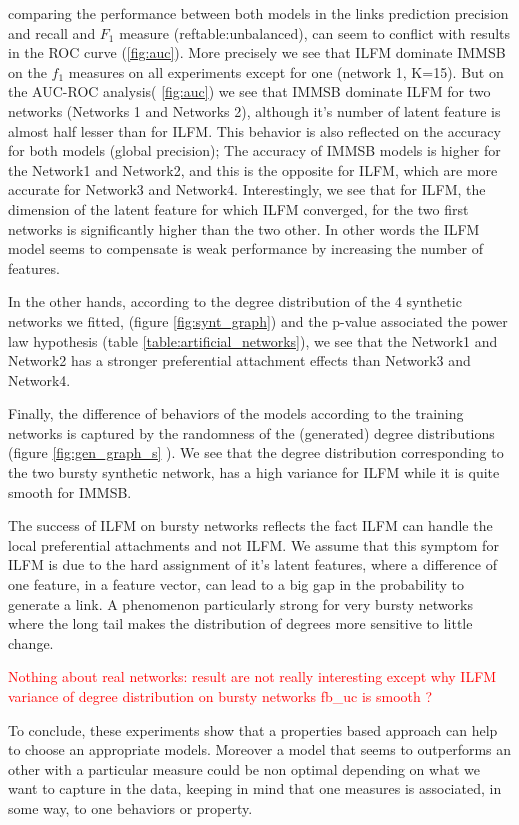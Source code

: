 comparing the performance between both models in the links prediction precision and recall and $F_1$ measure (ref{table:unbalanced}), can seem to conflict with results in the ROC curve (\ref{fig:auc}). More precisely we see that ILFM dominate IMMSB on the $f_1$ measures on all experiments except for one (network 1, K=15). But on the AUC-ROC analysis( \ref{fig:auc}) we see that IMMSB dominate ILFM for two networks (Networks 1 and Networks 2), although it's number of latent feature is almost half lesser than for ILFM. This behavior is also reflected on the accuracy for both models (global precision); The accuracy of IMMSB models is higher for the Network1 and Network2, and this is the opposite for ILFM, which are more accurate for Network3 and Network4. Interestingly, we see that for ILFM, the dimension of the latent feature for which ILFM converged, for the two first networks is significantly higher than the two other. In other words the ILFM model seems to compensate is weak performance by increasing the number of features.

In the other hands, according to the degree distribution of the 4 synthetic networks we fitted, (figure \ref{fig:synt_graph}) and the p-value associated the power law hypothesis (table \ref{table:artificial_networks}), we see that the Network1 and Network2 has a stronger preferential attachment effects than Network3 and Network4.


Finally, the difference of behaviors of the models according to the training networks is captured by the randomness of the (generated) degree distributions (figure \ref{fig:gen_graph_s} ). We see that the degree distribution corresponding to the two bursty synthetic network, has  a high variance for ILFM while it is quite smooth for IMMSB.

The success of ILFM on bursty networks reflects the fact ILFM can handle the local preferential attachments and not ILFM. We assume that this symptom for ILFM is due to the hard assignment of it's latent features, where a difference of one feature, in a feature vector, can lead to a big gap in the probability to generate a link. A phenomenon particularly strong for very bursty networks where the long tail makes the distribution of degrees more sensitive to little change.

\textcolor{red}{Nothing about real networks: result are not really interesting except why ILFM variance of degree distribution on bursty networks fb\_uc is smooth ? }

To conclude, these experiments show that a properties based approach can help to choose an appropriate models. Moreover a model that seems to outperforms an other with a particular measure could be non optimal depending on what we want to capture in the data, keeping in mind that one measures is associated, in some way, to one behaviors or property.
